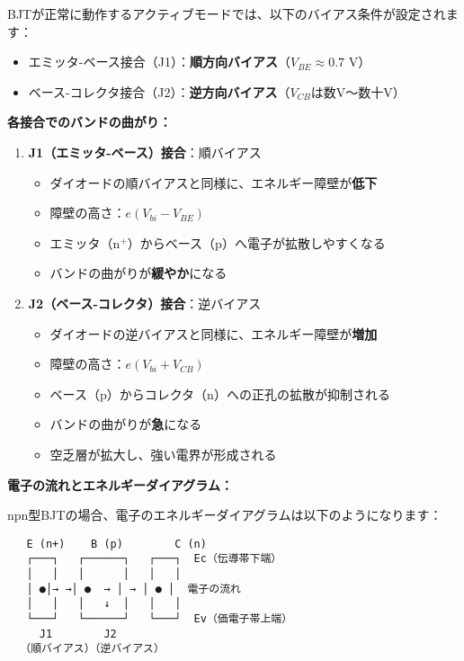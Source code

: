 BJTが正常に動作するアクティブモードでは、以下のバイアス条件が設定されます：

\begin{itemize}
\item エミッタ-ベース接合（J1）：\textbf{順方向バイアス}（$V_{BE} \approx 0.7$ V）
\item ベース-コレクタ接合（J2）：\textbf{逆方向バイアス}（$V_{CB}$は数V〜数十V）
\end{itemize}

\textbf{各接合でのバンドの曲がり：}

\begin{enumerate}
\item \textbf{J1（エミッタ-ベース）接合}：順バイアス
\begin{itemize}
\item ダイオードの順バイアスと同様に、エネルギー障壁が\textbf{低下}
\item 障壁の高さ：$e(V_{bi} - V_{BE})$
\item エミッタ（n$^+$）からベース（p）へ電子が拡散しやすくなる
\item バンドの曲がりが\textbf{緩やか}になる
\end{itemize}

\item \textbf{J2（ベース-コレクタ）接合}：逆バイアス
\begin{itemize}
\item ダイオードの逆バイアスと同様に、エネルギー障壁が\textbf{増加}
\item 障壁の高さ：$e(V_{bi} + V_{CB})$
\item ベース（p）からコレクタ（n）への正孔の拡散が抑制される
\item バンドの曲がりが\textbf{急}になる
\item 空乏層が拡大し、強い電界が形成される
\end{itemize}
\end{enumerate}

\textbf{電子の流れとエネルギーダイアグラム：}

npn型BJTの場合、電子のエネルギーダイアグラムは以下のようになります：

\begin{verbatim}
   E (n+)    B (p)        C (n)
   ┌───┐   ┌──────┐   ┌───┐  Ec（伝導帯下端）
   │   │   │      │   │   │
   │ ●│→ →│ ●  → │ → │ ● │  電子の流れ
   │   │   │   ↓  │   │   │
   └───┘   └──────┘   └───┘  Ev（価電子帯上端）
     J1        J2
  （順バイアス）（逆バイアス）
\end{verbatim}

